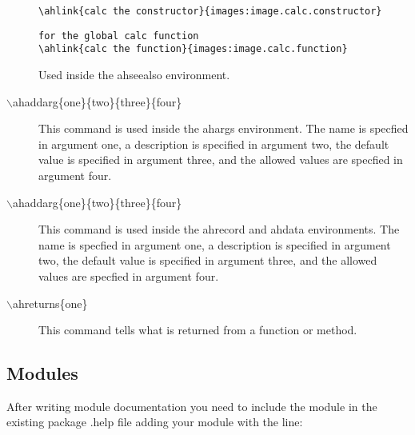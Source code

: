 \begin{description}
\begin{verbatim}
\ahlink{calc the constructor}{images:image.calc.constructor}
\end{verbatim}
\begin{verbatim}
for the global calc function
\ahlink{calc the function}{images:image.calc.function}
\end{verbatim}
Used inside the ahseealso environment.
%
\item[$\backslash$ahaddarg\{one\}\{two\}\{three\}\{four\}] This command is used inside
the ahargs environment.  The name is specfied in argument one, a description
is specified in argument two, the default value is specified in argument
three, and the allowed values are specfied in argument four.  
\item[$\backslash$ahaddarg\{one\}\{two\}\{three\}\{four\}] This command is
used inside the ahrecord and ahdata environments. The name is specfied in argument one, a description
is specified in argument two, the default value is specified in argument
three, and the allowed values are specfied in argument four.  
%
\item[$\backslash$ahreturns\{one\}] This command tells what is returned from a function
or method.
\end{description}


\subsection{Modules}
After writing module
documentation you need to include the module in the existing package .help
file adding your module with the line:\\
\begin{verbatim}

\end{verbatim}

